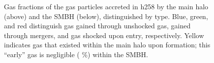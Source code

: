 \documentclass[manuscript]{aastex}
\begin{document}
\begin{figure}
\centerline{}
\centerline{}
\caption[]{Gas fractions of the gas particles accreted in h258 by the main halo (above) and the SMBH (below), distinguished by type. Blue, green, and red distinguish gas gained through unshocked gas, gained through mergers, and gas shocked upon entry, respectively. Yellow indicates gas that existed within the main halo upon formation; this ``early'' gas is negligible ( \%) within the SMBH.}
\label{h258piefrac} 
\end{figure}
\end{document}
